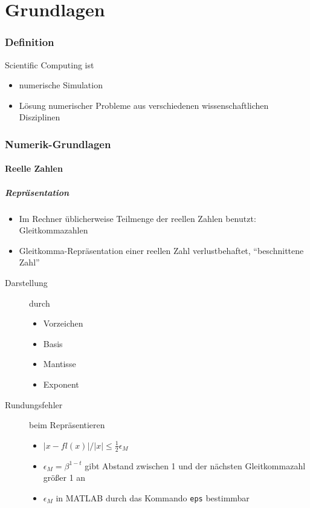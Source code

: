 \documentclass[a4paper, 12pt]{article}
\begin{document}
\tableofcontents
\pagebreak



\part{Grundlagen}



\section{Definition}
Scientific Computing ist
\begin{itemize}
  \item numerische Simulation
  \item Lösung numerischer Probleme aus verschiedenen wissenschaftlichen Disziplinen
\end{itemize}



\section{Numerik-Grundlagen}


\subsection{Reelle Zahlen}

\subsubsection*{Repräsentation}
\begin{itemize}
  \item Im Rechner üblicherweise Teilmenge der reellen Zahlen benutzt: Gleitkommazahlen
  \item Gleitkomma-Repräsentation einer reellen Zahl verlustbehaftet, ``beschnittene Zahl''
\end{itemize}
\begin{description}
  \item[Darstellung] durch
    \begin{itemize}
      \item Vorzeichen
      \item Basis
      \item Mantisse
      \item Exponent
    \end{itemize}
  \item[Rundungsfehler] beim Repräsentieren
    \begin{itemize}
      \item \(|x-fl(x)|/|x| \le \frac{1}{2} \epsilon_M\)
      \item \(\epsilon_M = \beta^{1-t}\) gibt Abstand zwischen 1 und der nächsten Gleitkommazahl größer 1 an
      \item \(\epsilon_M\) in MATLAB durch das Kommando \texttt{eps} bestimmbar
    \end{itemize}
\end{description}
\end{document}
